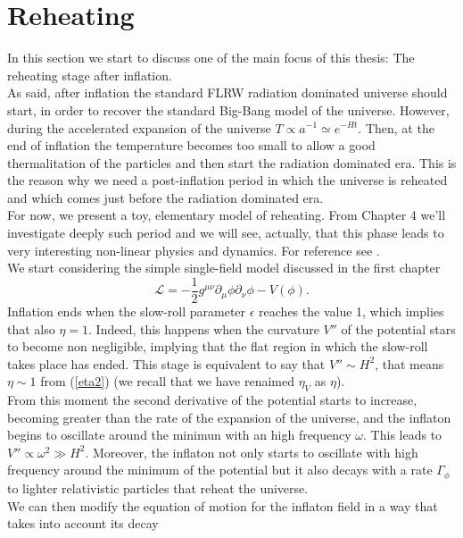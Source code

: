\documentclass[11pt,a4paper,twoside]{book}
\begin{document}
\section{Reheating}
In this section we start to discuss one of the main focus of this thesis: The reheating stage after inflation.\\
As said, after  inflation the standard FLRW  radiation dominated universe should start, in order to recover the standard Big-Bang model of the universe. However, during the accelerated expansion of the universe $ T \propto a^{-1} \simeq e^{-Ht} $. Then, at the end of inflation the temperature becomes too small to allow a good thermalitation of the particles and then start the radiation dominated era. This is the reason why we need a post-inflation period in which the universe is reheated and which comes just before the radiation dominated era.\\
For now, we present a toy, elementary model of reheating. From Chapter 4 we'll investigate deeply such period and we will see, actually, that this phase leads to very interesting non-linear physics and dynamics. For reference see \cite{Chap2:Kolb_Turner}.\\
We start considering the simple single-field model discussed in the first chapter
\begin{equation}
		\mathcal{L} = -\dfrac{1}{2} g^{\mu\nu} \partial_{\mu}\phi \partial_{\nu} \phi - V(\phi).
\end{equation}	
Inflation ends when the slow-roll parameter $\epsilon$ reaches the value 1, which implies that also $\eta=1$. Indeed, this happens when the curvature $ V'' $ of the potential stars to become non negligible, implying that the flat region in which the slow-roll takes place has ended. This stage is equivalent to say that $ V''\sim H^{2} $, that means $\eta \sim 1$ from (\ref{eta2}) (we recall that we have renaimed $\eta_{V}$ as $\eta$). \\
From this moment the second derivative of the potential starts to increase, becoming greater than the rate of the expansion of the universe, and the inflaton begins to oscillate around the minimun with an high frequency $\omega$. This leads to $ V'' \propto \omega^{2} \gg H^{2} $.
Moreover, the inflaton not only starts to oscillate with high frequency around the minimum of the potential but it also decays with a rate $\Gamma_{\phi}$ to lighter relativistic particles that reheat the universe.\\
We can then modify the equation of motion for the inflaton field in a way that takes into account its decay
\end{document}
